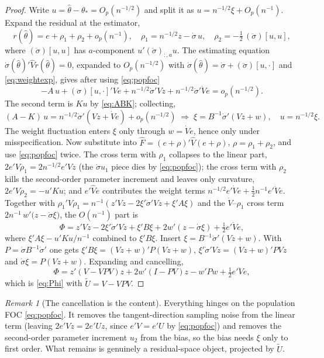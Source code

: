 \documentclass[11pt]{article}
\theoremstyle{plain}
\theoremstyle{remark}
\newtheorem*{remark}{Remark}
\begin{document}
\begin{proof}
Write $u=\hat\theta-\theta_\ast=O_p(n^{-1/2})$ and split it as
$u=n^{-1/2}\xi+O_p(n^{-1})$. Expand the residual at the estimator,
\[
  r(\hat\theta)=e+\rho_1+\rho_2+o_p(n^{-1}),\quad
  \rho_1=n^{-1/2}z-\dot\sigma\,u,\quad
  \rho_2=-\tfrac12\,(\ddot\sigma)[u,u],
\]
where $(\ddot\sigma)[u,u]$ has $a$-component $u'(\ddot\sigma)_{:,a}u$. The
estimating equation $\dot\sigma(\hat\theta)'\hat V r(\hat\theta)=0$, expanded to
$O_p(n^{-1/2})$ with $\dot\sigma(\hat\theta)=\dot\sigma+(\ddot\sigma)[u,\cdot]$
and \eqref{eq:weightexp}, gives after using \eqref{eq:popfoc}
\[
  -A\,u + (\ddot\sigma)[u,\cdot]'Ve + n^{-1/2}\dot\sigma'Vz + n^{-1/2}\dot\sigma'\dot V e = o_p(n^{-1/2}).
\]
The second term is $Ku$ by \eqref{eq:ABK}; collecting,
\begin{equation}\label{eq:xi}
  (A-K)\,u = n^{-1/2}\dot\sigma'(Vz+\dot V e)+o_p(n^{-1/2})
  \;\Longrightarrow\;
  \xi = B^{-1}\dot\sigma'(Vz+w),\quad u=n^{-1/2}\xi.
\end{equation}
The weight fluctuation enters $\xi$ only through $w=\dot V e$, hence only under
misspecification. Now substitute into
$\hat F=(e+\rho)'\hat V(e+\rho)$, $\rho=\rho_1+\rho_2$, and use
\eqref{eq:popfoc} twice. The cross term with $\rho_1$ collapses to the linear
part,
$2e'V\rho_1=2n^{-1/2}e'Vz$ (the $\dot\sigma u_1$ piece dies by
\eqref{eq:popfoc}); the cross term with $\rho_2$ kills the second-order
parameter increment and leaves only curvature,
$2e'V\rho_2=-u'Ku$; and $e'\hat V e$ contributes the weight terms
$n^{-1/2}e'\dot V e+\tfrac12 n^{-1}e'\ddot V e$. Together with
$\rho_1'V\rho_1=n^{-1}(z'Vz-2\xi'\dot\sigma'Vz+\xi'A\xi)$ and the
$\dot V$--$\rho_1$ cross term $2n^{-1}\,w'\!\big(z-\dot\sigma\xi\big)$, the
$O(n^{-1})$ part is
\[
  \Phi = z'Vz - 2\xi'\dot\sigma'Vz + \xi'B\xi + 2w'(z-\dot\sigma\xi) + \tfrac12 e'\ddot V e,
\]
where $\xi'A\xi-u'Ku/n^{-1}$ combined to $\xi'B\xi$. Insert
$\xi=B^{-1}\dot\sigma'(Vz+w)$. With $P=\dot\sigma B^{-1}\dot\sigma'$ one gets
$\xi'B\xi=(Vz+w)'P(Vz+w)$, $\xi'\dot\sigma'Vz=(Vz+w)'PVz$ and
$\dot\sigma\xi=P(Vz+w)$. Expanding and cancelling,
\[
  \Phi = z'(V-VPV)z + 2w'(I-PV)z - w'Pw + \tfrac12 e'\ddot V e,
\]
which is \eqref{eq:Phi} with $\tilde U=V-VPV$.
\end{proof}

\begin{remark}[The cancellation is the content]
Everything hinges on the population FOC \eqref{eq:popfoc}. It removes the
tangent-direction sampling noise from the linear term (leaving $2e'Vz=2e'Uz$,
since $e'V=e'U$ by \eqref{eq:popfoc}) and removes the second-order parameter
increment $u_2$ from the bias, so the bias needs $\xi$ only to first order. What
remains is genuinely a residual-space object, projected by $\tilde U$.
\end{remark}
\end{document}
